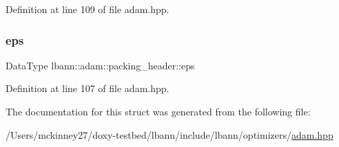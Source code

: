 Definition at line 109 of file adam.\+hpp.

\mbox{\label{structlbann_1_1adam_1_1packing__header_a31051ef5ef2bac2c34eb0fc959dc7494}} 
\subsubsection{\texorpdfstring{eps}{eps}}
{\footnotesize\ttfamily Data\+Type lbann\+::adam\+::packing\+\_\+header\+::eps}



Definition at line 107 of file adam.\+hpp.



The documentation for this struct was generated from the following file\+:\begin{DoxyCompactItemize}
\item 
/\+Users/mckinney27/doxy-\/testbed/lbann/include/lbann/optimizers/\hyperlink{adam_8hpp}{adam.\+hpp}\end{DoxyCompactItemize}
